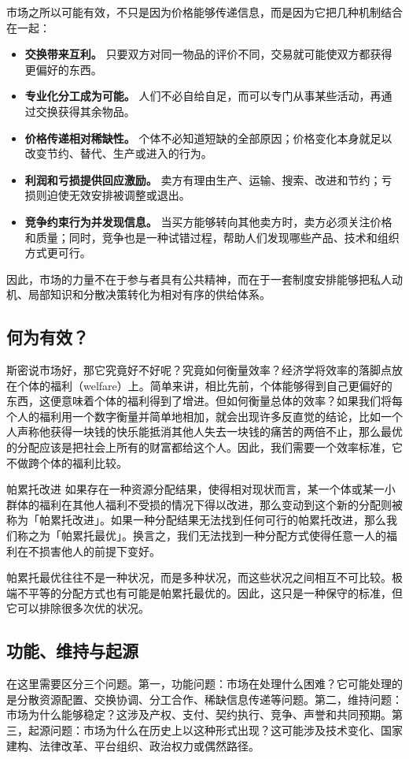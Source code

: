 \documentclass[UTF8,10pt,a4paper,scheme=chinese]{ctexart}
\begin{document}
市场之所以可能有效，不只是因为价格能够传递信息，而是因为它把几种机制结合在一起：

\begin{itemize}
  \item \textbf{交换带来互利。} 只要双方对同一物品的评价不同，交易就可能使双方都获得更偏好的东西。
  \item \textbf{专业化分工成为可能。} 人们不必自给自足，而可以专门从事某些活动，再通过交换获得其余物品。
  \item \textbf{价格传递相对稀缺性。} 个体不必知道短缺的全部原因；价格变化本身就足以改变节约、替代、生产或进入的行为。
  \item \textbf{利润和亏损提供回应激励。} 卖方有理由生产、运输、搜索、改进和节约；亏损则迫使无效安排被调整或退出。
  \item \textbf{竞争约束行为并发现信息。} 当买方能够转向其他卖方时，卖方必须关注价格和质量；同时，竞争也是一种试错过程，帮助人们发现哪些产品、技术和组织方式更可行。
\end{itemize}

因此，市场的力量不在于参与者具有公共精神，而在于一套制度安排能够把私人动机、局部知识和分散决策转化为相对有序的供给体系。

\subsection{何为有效？}
斯密说市场好，那它究竟好不好呢？究竟如何衡量效率？经济学将效率的落脚点放在个体的福利（welfare）上。简单来讲，相比先前，个体能够得到自己更偏好的东西，这便意味着个体的福利得到了增进。但如何衡量总体的效率？如果我们将每个人的福利用一个数字衡量并简单地相加，就会出现许多反直觉的结论，比如一个人声称他获得一块钱的快乐能抵消其他人失去一块钱的痛苦的两倍不止，那么最优的分配应该是把社会上所有的财富都给这个人。因此，我们需要一个效率标准，它不做跨个体的福利比较。
\begin{conceptbox}{帕累托改进}
如果存在一种资源分配结果，使得相对现状而言，某一个体或某一小群体的福利在其他人福利不受损的情况下得以改进，那么变动到这个新的分配则被称为「帕累托改进」。如果一种分配结果无法找到任何可行的帕累托改进，那么我们称之为「帕累托最优」。换言之，我们无法找到一种分配方式使得任意一人的福利在不损害他人的前提下变好。

帕累托最优往往不是一种状况，而是多种状况，而这些状况之间相互不可比较。极端不平等的分配方式也有可能是帕累托最优的。因此，这只是一种保守的标准，但它可以排除很多次优的状况。
\end{conceptbox}

\subsection{功能、维持与起源}
在这里需要区分三个问题。第一，功能问题：市场在处理什么困难？它可能处理的是分散资源配置、交换协调、分工合作、稀缺信息传递等问题。第二，维持问题：市场为什么能够稳定？这涉及产权、支付、契约执行、竞争、声誉和共同预期。第三，起源问题：市场为什么在历史上以这种形式出现？这可能涉及技术变化、国家建构、法律改革、平台组织、政治权力或偶然路径。
\end{document}
